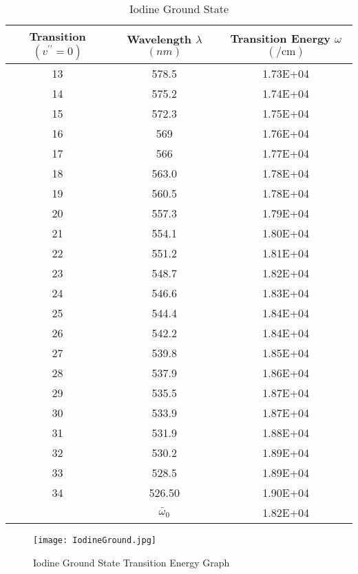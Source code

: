 \documentclass[12pt]{article}
\begin{document}
	\begin{table}[htbp]
		\centering
		\caption{Iodine Ground State}
		\begin{tabular}{ccc}
			\toprule
			Transition $(v^{\prime\prime} = 0)$ & Wavelength $\lambda$ $(\unit{nm})$ & Transition Energy $\omega$ $(\unit{\per\centi\meter})$ \\
			\midrule
			13 & 578.5 & 1.73E+04 \\
			14 & 575.2 & 1.74E+04 \\
			15 & 572.3 & 1.75E+04 \\
			16 & 569 & 1.76E+04 \\
			17 & 566 & 1.77E+04 \\
			18 & 563.0 & 1.78E+04 \\
			19 & 560.5 & 1.78E+04 \\
			20 & 557.3 & 1.79E+04 \\
			21 & 554.1 & 1.80E+04 \\
			22 & 551.2 & 1.81E+04 \\
			23 & 548.7 & 1.82E+04 \\
			24 & 546.6 & 1.83E+04 \\
			25 & 544.4 & 1.84E+04 \\
			26 & 542.2 & 1.84E+04 \\
			27 & 539.8 & 1.85E+04 \\
			28 & 537.9 & 1.86E+04 \\
			29 & 535.5 & 1.87E+04 \\
			30 & 533.9 & 1.87E+04 \\
			31 & 531.9 & 1.88E+04 \\
			32 & 530.2 & 1.89E+04 \\
			33 & 528.5 & 1.89E+04 \\
			34 & 526.50 & 1.90E+04 \\
			\cmidrule{2-3}      & $\bar{\omega}_0$ & 1.82E+04 \\
			\bottomrule
		\end{tabular}%
		\label{tab:IodineGroundState}%
	\end{table}%
	
	\begin{figure}[htbp]
		\centering
		\caption{Iodine Ground State Transition Energy Graph}
		\label{IodineGround}
		\texttt{[image: IodineGround.jpg]}
	\end{figure}
	
\clearpage
	
\end{document}
